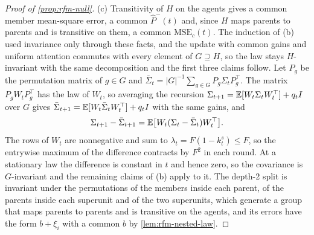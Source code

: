 \begin{proof}[Proof of \cref{prop:rfm-null}]
(c) Transitivity of $H$ on the agents gives a common member mean-square error, a common $\hat P^-(t)$ and, since $H$ maps parents to parents and is transitive on them, a common $\mathrm{MSE}_c(t)$. The induction of (b) used invariance only through these facts, and the update with common gains and uniform attention commutes with every element of $G\supseteq H$, so the law stays $H$-invariant with the same decomposition and the first three claims follow. Let $P_g$ be the permutation matrix of $g\in G$ and $\bar\Sigma_t=|G|^{-1}\sum_{g\in G}P_g\Sigma_tP_g^\top$. The matrix $P_gW_tP_g^\top$ has the law of $W_t$, so averaging the recursion $\Sigma_{t+1}=\mathbb{E}[W_t\Sigma_tW_t^\top]+q_tI$ over $G$ gives $\bar\Sigma_{t+1}=\mathbb{E}[W_t\bar\Sigma_tW_t^\top]+q_tI$ with the same gains, and
\begin{equation*}
\Sigma_{t+1}-\bar\Sigma_{t+1}=\mathbb{E}\bigl[W_t(\Sigma_t-\bar\Sigma_t)W_t^\top\bigr].
\end{equation*}
The rows of $W_t$ are nonnegative and sum to $\lambda_t=F(1-k^s_t)\le F$, so the entrywise maximum of the difference contracts by $F^2$ in each round. At a stationary law the difference is constant in $t$ and hence zero, so the covariance is $G$-invariant and the remaining claims of (b) apply to it. The depth-2 split is invariant under the permutations of the members inside each parent, of the parents inside each superunit and of the two superunits, which generate a group that maps parents to parents and is transitive on the agents, and its errors have the form $b+\xi_i$ with a common $b$ by \cref{lem:rfm-nested-law}.
\end{proof}

